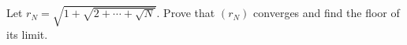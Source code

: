 Let $r_N=\sqrt{1+\sqrt{2+\cdots+\sqrt N}}$. Prove that $(r_N)$ converges and find the floor of its limit.
